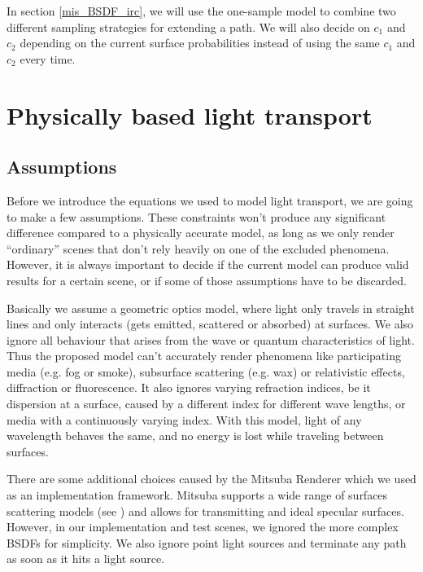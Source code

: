 In section \ref{mis_BSDF_irc}, we will use the one-sample model to combine two different sampling strategies for extending a path. We will also decide on $c_1$ and $c_2$ depending on the current surface probabilities instead of using the same $c_1$ and $c_2$ every time.


















\newpage
\section{Physically based light transport}

\subsection{Assumptions}
Before we introduce the equations we used to model light transport, we are going to make a few assumptions. These constraints won't produce any significant difference compared to a physically accurate model, as long as we only render ``ordinary'' scenes that don't rely heavily on one of the excluded phenomena. However, it is always important to decide if the current model can produce valid results for a certain scene, or if some of those assumptions have to be discarded.

Basically we assume a geometric optics model, where light only travels in straight lines and only interacts (gets emitted, scattered or absorbed) at surfaces. We also ignore all behaviour that arises from the wave or quantum characteristics of light.\\
Thus the proposed model can't accurately render phenomena like participating media (e.g. fog or smoke), subsurface scattering (e.g. wax) or relativistic effects, diffraction or fluorescence. It also ignores varying refraction indices, be it dispersion at a surface, caused by a different index for different wave lengths, or media with a continuously varying index. With this model, light of any wavelength behaves the same, and no energy is lost while traveling between surfaces.

There are some additional choices caused by the Mitsuba Renderer \cite{mitsuba} which we used as an implementation framework. Mitsuba supports a wide range of surfaces scattering models (see \cite[Mitsuba Documentation chapter 8.2]{mitsuba}) and allows for transmitting and ideal specular surfaces. However, in our implementation and test scenes, we ignored the more complex BSDFs for simplicity. We also ignore point light sources and terminate any path as soon as it hits a light source.

